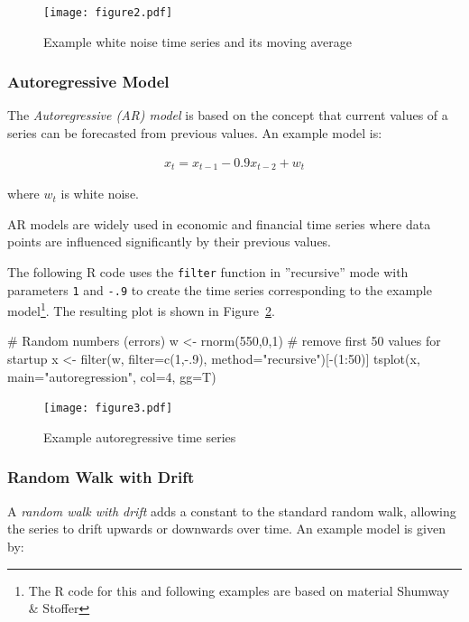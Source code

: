 \begin{figure}
\centering

\texttt{[image: figure2.pdf]}
\caption{Example white noise time series and its moving average}
\label{fig:figure2}
\end{figure}

\subsubsection*{Autoregressive Model}

The \emph{Autoregressive (AR) model} is based on the concept that current values of a series can be forecasted from previous values. An example model is:

\begin{align*}x_t = x_{t-1} - 0.9 x_{t-2} + w_t\end{align*}


\noindent where $w_t$ is white noise.

AR models are widely used in economic and financial time series where data points are influenced significantly by their previous values.

The following R code uses the \texttt{filter} function in ''recursive'' mode with parameters \texttt{1} and \texttt{-.9} to create the time series corresponding to the example model\footnote{The R code for this and following examples are based on material Shumway \& Stoffer}. The resulting plot is shown in Figure~\ref{fig:figure3}.

\begin{Rcode}
# Random numbers (errors)
w <- rnorm(550,0,1)
# remove first 50 values for startup
x <- filter(w, filter=c(1,-.9), method="recursive")[-(1:50)]
tsplot(x, main="autoregression", col=4, gg=T)
\end{Rcode}

\begin{figure}
\centering

\texttt{[image: figure3.pdf]}
\caption{Example autoregressive time series}
\label{fig:figure3}
\end{figure}

\subsubsection*{Random Walk with Drift}

A \emph{random walk with drift} adds a constant to the standard random walk, allowing the series to drift upwards or downwards over time. An example model is given by:


